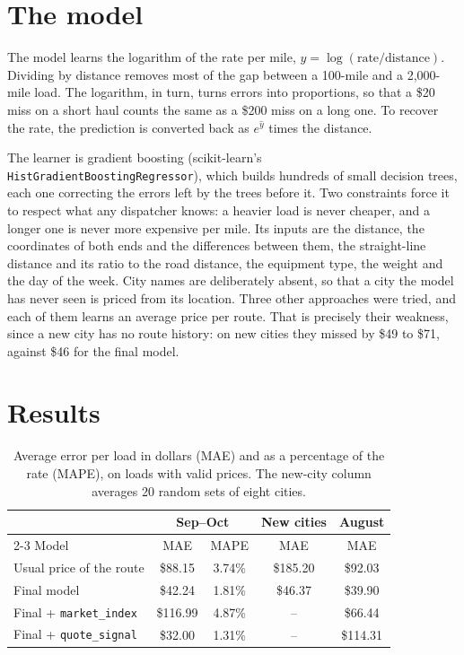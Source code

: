 \documentclass[11pt,a4paper]{article}
\newcommand{\var}[1]{\texttt{#1}}
\newcommand{\qs}{\var{quote\_signal}}
\newcommand{\mi}{\var{market\_index}}
\begin{document}
\section{The model}

The model learns the logarithm of the rate per mile, $y = \log(\text{rate}/\text{distance})$.
Dividing by distance removes most of the gap between a 100-mile and a 2,000-mile load.
The logarithm, in turn, turns errors into proportions, so that a \$20 miss on a short haul counts the same as a \$200 miss on a long one.
To recover the rate, the prediction is converted back as $e^{\hat y}$ times the distance.

The learner is gradient boosting (scikit-learn's \var{HistGradientBoostingRegressor}), which builds hundreds of small decision trees, each one correcting the errors left by the trees before it.
Two constraints force it to respect what any dispatcher knows: a heavier load is never cheaper, and a longer one is never more expensive per mile.
Its inputs are the distance, the coordinates of both ends and the differences between them, the straight-line distance and its ratio to the road distance, the equipment type, the weight and the day of the week.
City names are deliberately absent, so that a city the model has never seen is priced from its location.
Three other approaches were tried, and each of them learns an average price per route.
That is precisely their weakness, since a new city has no route history: on new cities they missed by \$49 to \$71, against \$46 for the final model.

\section{Results}

\begin{table}[ht]
\centering\small
\caption{Average error per load in dollars (MAE) and as a percentage of the rate (MAPE), on loads with valid prices. The new-city column averages 20 random sets of eight cities.}
\label{tab:results}
\begin{tabular}{lcccc}
\toprule
& \multicolumn{2}{c}{Sep--Oct} & New cities & August \\
\cmidrule(lr){2-3}
Model & MAE & MAPE & MAE & MAE \\
\midrule
Usual price of the route & \$88.15 & 3.74\% & \$185.20 & \$92.03 \\
Final model & \$42.24 & 1.81\% & \$46.37 & \$39.90 \\
Final + \mi & \$116.99 & 4.87\% & -- & \$66.44 \\
Final + \qs & \$32.00 & 1.31\% & -- & \$114.31 \\
\bottomrule
\end{tabular}
\end{table}
\end{document}
